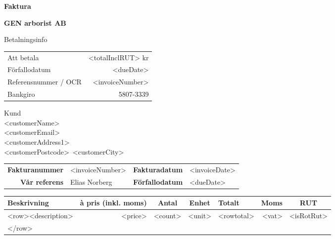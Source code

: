 \documentclass[a4paper,11pt]{extarticle}
\newcommand{\changefont}{%
        \fontsize{9}{11}\selectfont
    }
\begin{document}
\pagestyle{fancy}
\fancyhf{} %
\renewcommand{\headrulewidth}{0pt}
\renewcommand{\footrulewidth}{0pt}

\setlength{\fboxsep}{1.5em}
\setlength{\parindent}{0pt}

\begin{minipage}[b]{0.4\textwidth}
\raggedright
{\color{Primary}
\fontsize{36}{0}\selectfont
\textbf{Faktura}}
\end{minipage}%
\begin{minipage}[b]{0.6\textwidth}
\raggedleft
{\color{Secondary}
\fontsize{36}{0}\selectfont
\textbf{GEN arborist AB}}
\end{minipage}

\vspace{2em}
\begin{minipage}[t]{0.6\textwidth}
{\huge Betalningsinfo}\\
{\large\color{Primary}
\begin{tabularx}{\textwidth}{@{}lr}
Att betala & <totalInclRUT> kr \\
Förfallodatum & <dueDate> \\
Referensnummer / OCR & <invoiceNumber> \\
Bankgiro & 5807-3339 \\
\end{tabularx}
}
\vspace{2em}
\end{minipage}%
\begin{minipage}[t]{0.3\textwidth}
{\huge Kund}\\
<customerName>\\
<customerEmail>\\
<customerAddress1>\\
<customerPostcode>~<customerCity>\\
\end{minipage}

\renewcommand\arraystretch{1.5}
\begin{tabular*}{\linewidth}{rlrl}
    \textbf{Fakturanummer} & <invoiceNumber> & \textbf{Fakturadatum} & <invoiceDate> \\
    \textbf{Vår referens} & Elias Norberg & \textbf{Förfallodatum} & <dueDate> \\
\end{tabular*}

\begin{tabularx}{\linewidth}{Xrrrrrc}
\rowcolor{Primary}
\changefont \textbf{Beskrivning} &
\multicolumn{1}{l}{\changefont \textbf{à pris (inkl. moms)}} &
\multicolumn{1}{c}{\changefont \textbf{Antal}} &
\multicolumn{1}{c}{\changefont \textbf{Enhet}} &
\multicolumn{1}{l}{\changefont \textbf{Totalt}} &
\multicolumn{1}{c}{\changefont \textbf{Moms}} &
\changefont \textbf{RUT}\\
\hline
    <row><description> & <price> & <count> & <unit> & <rowtotal> & <vat> & <isRotRut>\\
    </row>
    & & & & & & \\
\end{tabularx}
\end{document}
